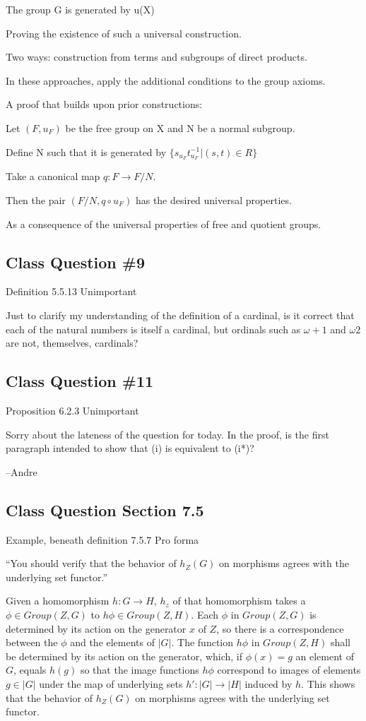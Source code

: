 \documentclass[12pt]{article}
\begin{document}
The group G is generated by u(X)

\noindent
Proving the existence of such a universal construction.

Two ways: construction from terms and subgroups of direct products.

In these approaches, apply the additional conditions to the group axioms.

\noindent
A proof that builds upon prior constructions:

Let $(F, u_F)$ be the free group on X and N be a normal subgroup.

Define N such that it is generated by $\{s_{u_F}t_{u_F}^{-1} | (s, t) \in R\}$

Take a canonical map $q: F \to F \slash N$.

Then the pair $(F\slash N, q \circ u_F)$ has the desired universal properties.

As a consequence of the universal properties of free and quotient groups.

\subsection{Class Question \#9}

Definition 5.5.13
Unimportant

Just to clarify my understanding of the definition of a cardinal, is it correct that each of the natural numbers is itself a cardinal, but ordinals such as $\omega + 1$ and $\omega 2$ are not, themselves, cardinals?

\subsection{Class Question \#11}

Proposition 6.2.3
Unimportant

Sorry about the lateness of the question for today.  In the proof, is the first paragraph intended to show that (i) is equivalent to (i*)?

--Andre

\subsection{Class Question Section 7.5}

Example, beneath definition 7.5.7
Pro forma

``You should verify that the behavior of $h_Z(G)$ on morphisms agrees with the underlying set functor.''

Given a homomorphism $h: G \to H$, $h_z$ of that homomorphism takes a $\phi \in Group(Z, G)$ to $h\phi \in Group(Z, H)$.  Each $\phi$ in $Group(Z, G)$ is determined by its action on the generator $x$ of $Z$, so there is a correspondence between the $\phi$ and the elements of $|G|$.  The function $h \phi$ in $Group(Z, H)$ shall be determined by its action on the generator, which, if $\phi(x) = g$ an element of $G$, equals $h(g)$ so that the image functions $h \phi$ correspond to images of elements $g \in |G|$ under the map of underlying sets $h': |G| \to |H|$ induced by $h$.  This shows that the behavior of $h_Z(G)$ on morphisms agrees with the underlying set functor.
\end{document}
